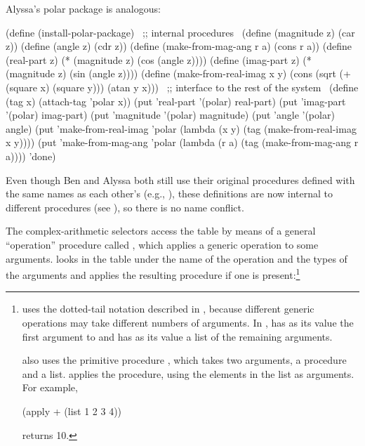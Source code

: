 Alyssa's polar package is analogous:

\begin{codeBlock}
(define (install-polar-package)
  ~\textrm{;; internal procedures}~
  (define (magnitude z) (car z))
  (define (angle z) (cdr z))
  (define (make-from-mag-ang r a) (cons r a))
  (define (real-part z) (* (magnitude z)
                           (cos (angle z))))
  (define (imag-part z) (* (magnitude z)
                           (sin (angle z))))
  (define (make-from-real-imag x y)
    (cons (sqrt (+ (square x) (square y)))
          (atan y x)))
  ~\textrm{;; interface to the rest of the system}~
  (define (tag x) (attach-tag 'polar x))
  (put 'real-part '(polar) real-part)
  (put 'imag-part '(polar) imag-part)
  (put 'magnitude '(polar) magnitude)
  (put 'angle '(polar) angle)
  (put 'make-from-real-imag 'polar
       (lambda (x y) (tag
                       (make-from-real-imag x y))))
  (put 'make-from-mag-ang 'polar
       (lambda (r a) (tag
                       (make-from-mag-ang r a))))
  'done)
\end{codeBlock}

\noindent
Even though Ben and Alyssa both still use their original procedures defined
with the same names as each other's (e.g., ), these definitions
are now internal to different procedures (see ), so there is
no name conflict.

The complex-arithmetic selectors access the table by means of a general
``operation'' procedure called , which applies a generic
operation to some arguments.   looks in the table under the
name of the operation and the types of the arguments and applies the resulting
procedure if one is present:\footnote{ uses the dotted-tail
notation described in , because different generic operations
may take different numbers of arguments.  In , 
has as its value the first argument to  and  has
as its value a list of the remaining arguments.

 also uses the primitive procedure , which
takes two arguments, a procedure and a list.   applies the
procedure, using the elements in the list as arguments.  For example,

\begin{compactCodeBlock}
(apply + (list 1 2 3 4))
\end{compactCodeBlock}

\noindent
returns 10.}

